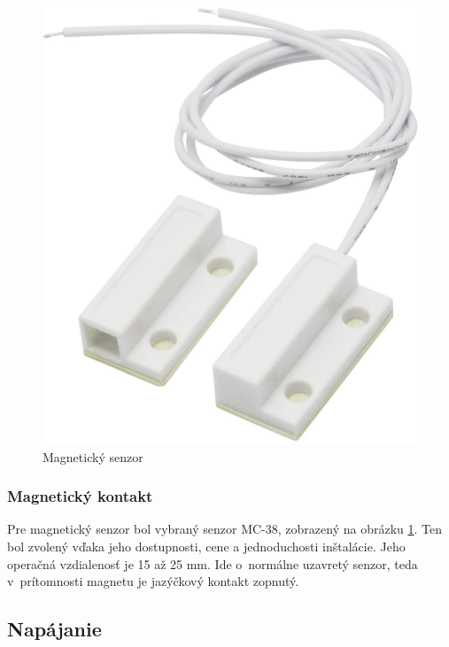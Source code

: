 \begin{figure}[!ht]
    \centering
    \includegraphics[scale=0.1]{obrazky-figures/magneticky_senzor.jpg}
    \caption[Magnetický senzor]{Magnetický senzor\footnotemark}
    \label{fig:magneticky_senzor}
\end{figure}

\subsubsection{Magnetický kontakt}

Pre magnetický senzor bol vybraný senzor MC-38, zobrazený na obrázku \ref{fig:magneticky_senzor}. Ten bol zvolený vďaka jeho dostupnosti, cene a jednoduchosti inštalácie. Jeho operačná vzdialenosť je 15 až 25 mm. Ide o~normálne uzavretý senzor, teda v~prítomnosti magnetu je jazýčkový kontakt zopnutý.


\subsection{Napájanie}

